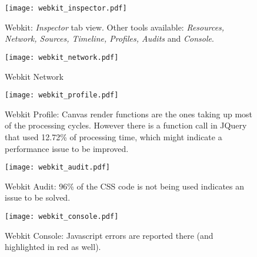       \begin{figure}[ht]
        \begin{center}
          \texttt{[image: webkit\_inspector.pdf]}
        \end{center}
        \caption{Webkit: \emph{Inspector} tab view. Other tools available: \emph{Resources, Network, Sources, Timeline, Profiles, Audits} and \emph{Console}.}
        \label{fig:webkit_inspector}
      \end{figure}

      \begin{figure}[ht]
        \begin{center}
          \texttt{[image: webkit\_network.pdf]}
        \end{center}
        \caption{Webkit Network}
        \label{fig:webkit_network}
      \end{figure}

      \begin{figure}[ht]
        \begin{center}
          \texttt{[image: webkit\_profile.pdf]}
        \end{center}
        \caption{Webkit Profile: Canvas render functions are the ones taking up most of the processing cycles. However there is a function call in JQuery that used 12.72\% of processing time, which might indicate a performance issue to be improved.}
        \label{fig:webkit_profile}
      \end{figure}

      \begin{figure}[ht]
        \begin{center}
          \texttt{[image: webkit\_audit.pdf]}
        \end{center}
        \caption{Webkit Audit: 96\% of the CSS code is not being used indicates an issue to be solved.}
        \label{fig:webkit_audit}
      \end{figure}

      \begin{figure}[ht]
        \begin{center}
          \texttt{[image: webkit\_console.pdf]}
        \end{center}
        \caption{Webkit Console: Javascript errors are reported there (and highlighted in red as well).}
        \label{fig:webkit_console}
      \end{figure}

      \clearpage

